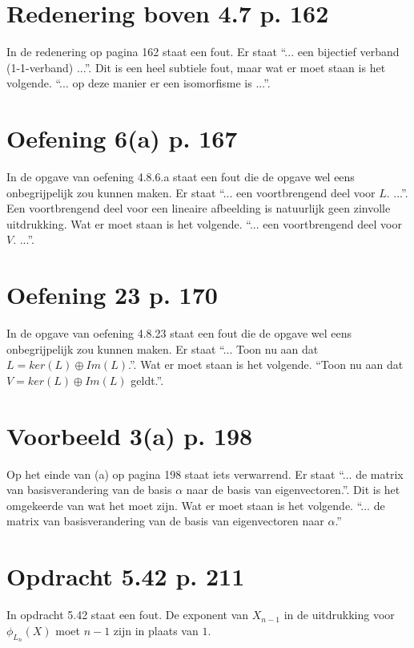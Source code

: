 \documentclass[lineaire_algebra_oplossingen.tex]{subfiles}
\begin{document}
\section{Redenering boven 4.7 p. 162}
In de redenering op pagina 162 staat een fout. Er staat ``... een bijectief verband (1-1-verband) ...''.
Dit is een heel subtiele fout, maar wat er moet staan is het volgende. ``... op deze manier er een isomorfisme is ...''. 

\section{Oefening 6(a) p. 167}
In de opgave van oefening 4.8.6.a staat een fout die de opgave wel eens onbegrijpelijk zou kunnen maken.
Er staat ``... een voortbrengend deel voor $L$. ...''.
Een voortbrengend deel voor een lineaire afbeelding is natuurlijk geen zinvolle uitdrukking.
Wat er moet staan is het volgende. ``... een voortbrengend deel voor $V$. ...''.

\section{Oefening 23 p. 170}
In de opgave van oefening 4.8.23 staat een fout die de opgave wel eens onbegrijpelijk zou kunnen maken.
Er staat ``... Toon nu aan dat $L = ker(L) \oplus Im(L)$.''.
Wat er moet staan is het volgende.
``Toon nu aan dat $V = ker(L) \oplus Im(L)$ geldt.''.

\section{Voorbeeld 3(a) p. 198}
Op het einde van (a) op pagina 198 staat iets verwarrend.
Er staat ``... de matrix van basisverandering van de basis $\alpha$ naar de basis van eigenvectoren.''.
Dit is het omgekeerde van wat het moet zijn.
Wat er moet staan is het volgende.
``... de matrix van basisverandering van de basis van eigenvectoren naar $\alpha$.''

\section{Opdracht 5.42 p. 211}
In opdracht 5.42 staat een fout. De exponent van $X_{n-1}$ in de uitdrukking voor $\phi_{L_{n}}(X)$ moet $n-1$ zijn in plaats van $1$.
\end{document}
